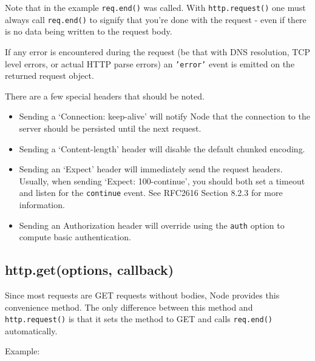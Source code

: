 Note that in the example \texttt{req.end()} was called. With
\texttt{http.request()} one must always call \texttt{req.end()} to
signify that you're done with the request - even if there is no data
being written to the request body.

If any error is encountered during the request (be that with DNS
resolution, TCP level errors, or actual HTTP parse errors) an
\texttt{'error'} event is emitted on the returned request object.

There are a few special headers that should be noted.

\begin{itemize}
\item
  Sending a `Connection: keep-alive' will notify Node that the
  connection to the server should be persisted until the next request.
\item
  Sending a `Content-length' header will disable the default chunked
  encoding.
\item
  Sending an `Expect' header will immediately send the request headers.
  Usually, when sending `Expect: 100-continue', you should both set a
  timeout and listen for the \texttt{continue} event. See RFC2616
  Section 8.2.3 for more information.
\item
  Sending an Authorization header will override using the \texttt{auth}
  option to compute basic authentication.
\end{itemize}

\subsection{http.get(options, callback)}

Since most requests are GET requests without bodies, Node provides this
convenience method. The only difference between this method and
\texttt{http.request()} is that it sets the method to GET and calls
\texttt{req.end()} automatically.

Example:

\begin{Shaded}
\begin{Highlighting}[]
\NormalTok{(}\NormalTok{, }
  \NormalTok{(} \NormalTok{+ }\NormalTok{);}
\NormalTok{(}\NormalTok{, }
  \NormalTok{(} \NormalTok{+ }\NormalTok{);}
\NormalTok{\});}
\end{Highlighting}
\end{Shaded}

